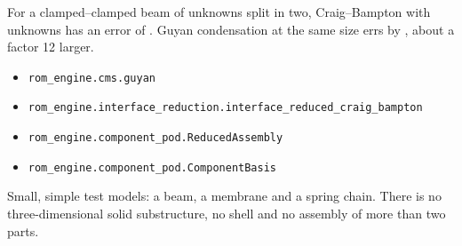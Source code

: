 \newpage\thispagestyle{hl}
\par
{}
\begin{hlheadline}For a clamped--clamped beam of \ccmBeamFull{} unknowns split in two, Craig--Bampton with \ccmCbFiveSize{} unknowns has an error of \ccmCbFiveErr. Guyan condensation at the same size errs by \ccmGuyTwelveErr, about a factor 12 larger.\end{hlheadline}
{\begin{itemize}\setlength\itemsep{2pt}
\item \texttt{rom\_engine.cms.guyan}
\item \texttt{rom\_engine.interface\_reduction.interface\_reduced\_craig\_bampton}
\item \texttt{rom\_engine.component\_pod.ReducedAssembly}
\item \texttt{rom\_engine.component\_pod.ComponentBasis}
\end{itemize}}
\begin{hllimit}Small, simple test models: a beam, a membrane and a spring chain. There is no three-dimensional solid substructure, no shell and no assembly of more than two parts.\end{hllimit}
